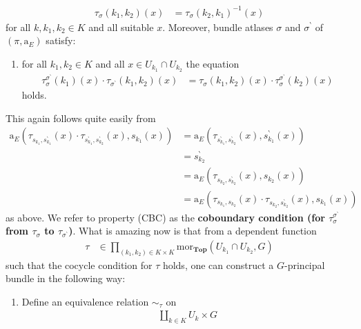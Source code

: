 \begin{exa}[Bundles 2]
\begin{align*}
  \\
  \tau_{\sigma}(k_{1},k_{2})(x)
  &=
  \tau_{\sigma}(k_{2},k_{1})^{-1}(x)
\end{align*}
for all $k,k_{1},k_{2} \in K$ and all suitable $x$.
Moreover, bundle atlases $\sigma$ and $\sigma^{\backprime}$ of $(\pi,\mathrm{a}_{E})$ satisfy:
\begin{enumerate}
\item[(CBC)]
for all $k_{1},k_{2} \in K$ and all $x \in U_{k_{1}} \cap U_{k_{2}}$ the equation
\begin{align*}
  \tau_{\sigma}^{\sigma^{\backprime}}(k_{1})(x)
  \cdot
  \tau_{\sigma^{\backprime}}(k_{1},k_{2})(x)
  &=
  \tau_{\sigma}(k_{1},k_{2})(x)
  \cdot
  \tau_{\sigma}^{\sigma^{\backprime}}(k_{2})(x)
\end{align*}
holds.
\end{enumerate}
This again follows quite easily from
\begin{align*}
  \mathrm{a}_{E}
  \left(
    \tau_{s_{k_{1}},s_{k_{1}}^{\backprime}}(x)
    \cdot
    \tau_{s_{k_{1}}^{\backprime},s_{k_{2}}^{\backprime}}(x),
    s_{k_{1}}(x)
  \right)
  &=
  \mathrm{a}_{E}
  \left(
    \tau_{s_{k_{1}}^{\backprime},s_{k_{2}}^{\backprime}}(x),
    s_{k_{1}}^{\backprime}(x)
  \right)
  \\
  &=
  s_{k_{2}}^{\backprime}
  \\
  &=
  \mathrm{a}_{E}
  \left(
    \tau_{s_{k_{2}},s_{k_{2}}^{\backprime}}(x),
    s_{k_{2}}(x)
  \right)
  \\
  &=
  \mathrm{a}_{E}
  \left(
    \tau_{s_{k_{1}},s_{k_{2}}}(x)
    \cdot
    \tau_{s_{k_{2}},s_{k_{2}}^{\backprime}}(x),
    s_{k_{1}}(x)
  \right)
\end{align*}
as above.
We refer to property (CBC) as the \textbf{coboundary condition (for $\tau_{\sigma}^{\sigma^{\backprime}}$ from $\tau_{\sigma}$ to $\tau_{\sigma^{\backprime}}$)}.
What is amazing now is that from a dependent function
\begin{align*}
  \tau
  &\in
  \prod_{(k_{1},k_{2}) \in K \times K}
  \mathrm{mor}_{\mathbf{Top}}(U_{k_{1}} \cap U_{k_{2}},G)
\end{align*}
such that the cocycle condition for $\tau$ holds, one can construct a $G$-principal bundle in the following way:
\begin{enumerate}
\item[(a)]
Define an equivalence relation $\sim_{\tau}$ on
\begin{align*}
  \coprod_{k \in K}
  U_{k}
  \times
  G
\end{align*}

\end{enumerate}
\end{exa}
